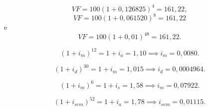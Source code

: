 \documentclass[a4paper]{report}
\begin{document}

\[
VF = 100\left( 1+0,126825 \right) ^{4} = 161,22
,\] \[
VF = 100\left( 1+0,061520 \right) ^{8} = 161,22
\] e \[
VF = 100\left( 1+0,01 \right) ^{48} = 161,22
.\] 


\[
\left( 1 + i_m \right) ^{12} = 1 + i_a = 1,10 \implies i_m = 0,0080
.\] 


\[
\left( 1+i_d \right) ^{30} = 1 + i_m = 1,015 \implies i_d = 0,0004964
.\] 


\[
\left( 1+i_m \right) ^{6} = 1 + i_s = 1,58 \implies i_m = 0,07922
.\] 


\[
\left( 1 + i_{sem} \right) ^{52} = 1 + i_a = 1,78 \implies i_{sem} = 0,01115
.\]
\end{document}
